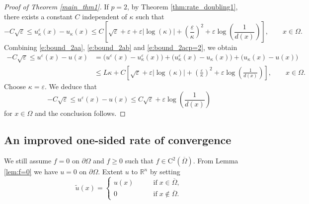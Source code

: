 \documentclass[12pt,reqno]{amsart}
\numberwithin{figure}{section}
\theoremstyle{plain}
\theoremstyle{remark}
\numberwithin{equation}{section}
\newcommand{\R}{\mathbb{R}}
\newcommand{\rmC}{\mathrm{C}}
\begin{document}
\begin{proof}[Proof of Theorem \ref{main_thm1}]
\noindent If $p=2$, by Theorem \ref{thm:rate_doubling1}, there exists a constant $C$ independent of $\kappa$ such that
\begin{equation}\label{e:bound_2acp=2}
    -C\sqrt{\varepsilon}\leq u^\varepsilon_\kappa(x) - u_\kappa(x) \leq C\left[\sqrt{\varepsilon} + \varepsilon + \varepsilon |\log(\kappa)|+\left(\frac{\varepsilon}{\kappa}\right)^2 + \varepsilon\log\left(\frac{1}{d(x)}\right)\right], \qquad x\in \Omega.
\end{equation}
Combining \eqref{e:bound_2aa}, \eqref{e:bound_2ab} and \eqref{e:bound_2acp=2}, we obtain
\begin{equation*}
\begin{split}
   -C\sqrt{\varepsilon}\leq u^\varepsilon(x) - u(x) &= \Big(u^\varepsilon(x) - u^\varepsilon_\kappa(x)\Big) + \Big(u^\varepsilon_\kappa(x) - u_\kappa(x)\Big) + \Big(u_\kappa(x) - u(x)\Big) \\
    &\leq L\kappa + C\left[\sqrt{\varepsilon} + \varepsilon|\log(\kappa)| + \left(\frac{\varepsilon}{\kappa}\right)^{2} + \varepsilon\log\left(\frac{1}{d(x)}\right) \right], \qquad x\in \Omega.
\end{split}
\end{equation*}
Choose $\kappa = \varepsilon$. We deduce that
\begin{equation*}
    -C\sqrt{\varepsilon}\leq u^\varepsilon(x) - u(x) \leq C\sqrt{\varepsilon} +\varepsilon\log\left(\frac{1}{d(x)}\right)
\end{equation*}
for $x\in \Omega$ and the conclusion follows. 
\end{proof}


\subsection{An improved one-sided rate of convergence}
We still assume $f = 0$ on $\partial\Omega$ and $f\geq 0$ such that $f\in \rmC^2(\overline{\Omega})$. From Lemma \ref{lem:f=0} we have $u = 0$ on $\partial\Omega$. Extent $u$ to $\R^n$ by setting 
\begin{equation*}
    \tilde{u}(x) = \begin{cases}
      u(x) &\qquad\text{if}\;x\in \overline{\Omega},\\
      0 &\qquad\text{if}\;x\notin \overline{\Omega}.
    \end{cases}
\end{equation*}
\end{document}
